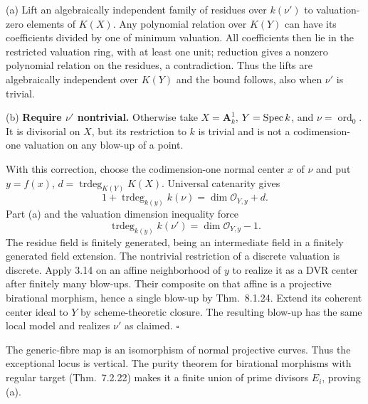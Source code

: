 \documentclass[11pt]{article}
\let\chapterexercise\exercise
\renewcommand{\exercise}[2]{\Needspace{8\baselineskip}\chapterexercise{#1}{#2}}
\begin{document}
\pf
(a) Lift an algebraically independent family of residues over $k(\nu')$ to valuation-zero elements of $K(X)$. Any polynomial relation over $K(Y)$ can have its coefficients divided by one of minimum valuation. All coefficients then lie in the restricted valuation ring, with at least one unit; reduction gives a nonzero polynomial relation on the residues, a contradiction. Thus the lifts are algebraically independent over $K(Y)$ and the bound follows, also when $\nu'$ is trivial.

(b) \textbf{Require $\nu'$ nontrivial.} Otherwise take $X=\mathbf A^1_k$, $Y=\operatorname{Spec} k$, and $\nu=\operatorname{ord}_0$. It is divisorial on $X$, but its restriction to $k$ is trivial and is not a codimension-one valuation on any blow-up of a point.

With this correction, choose the codimension-one normal center $x$ of $\nu$ and put $y=f(x)$, $d=\operatorname{trdeg}_{K(Y)}K(X)$. Universal catenarity gives
\[ 1+\operatorname{trdeg}_{k(y)}k(\nu)=\dim\mathcal O_{Y,y}+d. \]
Part (a) and the valuation dimension inequality force
\[ \operatorname{trdeg}_{k(y)}k(\nu')=\dim\mathcal O_{Y,y}-1. \]
The residue field is finitely generated, being an intermediate field in a finitely generated field extension. The nontrivial restriction of a discrete valuation is discrete. Apply 3.14 on an affine neighborhood of $y$ to realize it as a DVR center after finitely many blow-ups. Their composite on that affine is a projective birational morphism, hence a single blow-up by Thm.~8.1.24. Extend its coherent center ideal to $Y$ by scheme-theoretic closure. The resulting blow-up has the same local model and realizes $\nu'$ as claimed. \hfill$\square$

\pf
The generic-fibre map is an isomorphism of normal projective curves. Thus the exceptional locus is vertical. The purity theorem for birational morphisms with regular target (Thm.~7.2.22) makes it a finite union of prime divisors $E_i$, proving (a).
\end{document}
